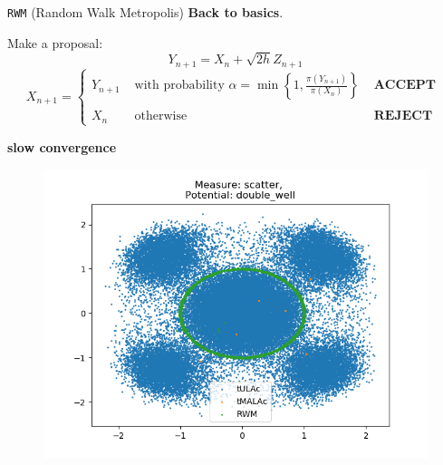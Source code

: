 \documentclass[aspectratio=169]{beamer}
\begin{document}
\begin{frame}{\texttt{RWM} (Random Walk Metropolis)}
    \textbf{Back to basics}.
    
        Make a proposal:
        \[ Y_{n+1} = X_n + \sqrt{2h}Z_{n+1}\] \[\]
        \[ X_{n+1} = \begin{cases}
            Y_{n+1} & \text{ with probability } \alpha = \min \left\lbrace 1, \frac{ \pi\left( Y_{n+1}\right) } { \pi\left( X_n\right) } \right\rbrace & \textbf{ ACCEPT } \\ \\ 
            X_n & \text{ otherwise } & \textbf{ REJECT }
        \end{cases}\]
   \[\]
   \[\]
   \centerline{\textbf{slow convergence}}
\end{frame}



\begin{frame}
\begin{figure}
    \centering
    \includegraphics[width=0.8\linewidth]{WriteUp/Presentation/Figures/tulac_malac_rwm_coldwell.png}
\end{figure}
\end{frame}


    
\end{document}

